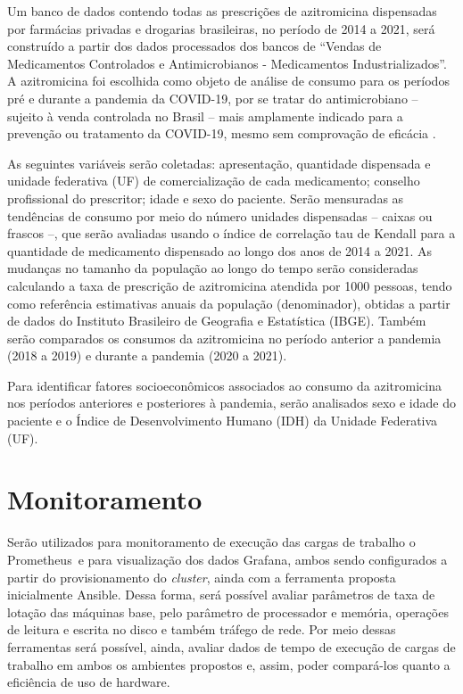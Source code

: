 Um banco de dados contendo todas as prescrições de azitromicina dispensadas por farmácias privadas
e drogarias brasileiras, no período de 2014 a 2021, será construído a partir dos dados processados dos
bancos de “Vendas de Medicamentos Controlados e Antimicrobianos - Medicamentos Industrializados”.
A azitromicina foi escolhida como objeto de análise de consumo para os períodos pré e durante a
pandemia da COVID-19, por se tratar do antimicrobiano – sujeito à venda controlada no Brasil – mais
amplamente indicado para a prevenção ou tratamento da COVID-19, mesmo sem comprovação de
eficácia \cite{santos2021kit}.

As seguintes variáveis serão coletadas: apresentação, quantidade dispensada e unidade federativa (UF)
de comercialização de cada medicamento; conselho profissional do prescritor; idade e sexo do paciente.
Serão mensuradas as tendências de consumo por meio do número unidades dispensadas – caixas ou
frascos –, que serão avaliadas usando o índice de correlação tau de Kendall para a quantidade de
medicamento dispensado ao longo dos anos de 2014 a 2021. As mudanças no tamanho da população
ao longo do tempo serão consideradas calculando a taxa de prescrição de azitromicina atendida por
1000 pessoas, tendo como referência estimativas anuais da população (denominador), obtidas a partir
de dados do Instituto Brasileiro de Geografia e Estatística (IBGE). Também serão comparados os
consumos da azitromicina no período anterior a pandemia (2018 a 2019) e durante a pandemia (2020 a
2021).

Para identificar fatores socioeconômicos associados ao consumo da azitromicina nos períodos anteriores
e posteriores à pandemia, serão analisados sexo e idade do paciente e o Índice de Desenvolvimento
Humano (IDH) da Unidade Federativa (UF).


\section{Monitoramento}
\label{cap:monitor}

Serão utilizados para monitoramento de execução das cargas de trabalho o Prometheus\textregistered \  e para visualização dos dados Grafana\textregistered, ambos sendo configurados a partir do provisionamento do  \emph{cluster}, ainda com a ferramenta proposta inicialmente Ansible\textregistered. Dessa forma, será possível avaliar parâmetros de taxa de lotação das máquinas base, pelo parâmetro de processador e memória, operações de leitura e escrita no disco e também tráfego de rede. Por meio dessas ferramentas será possível, ainda, avaliar dados de tempo de execução de cargas de trabalho em ambos os ambientes propostos e, assim, poder compará-los quanto a eficiência de uso de hardware.

